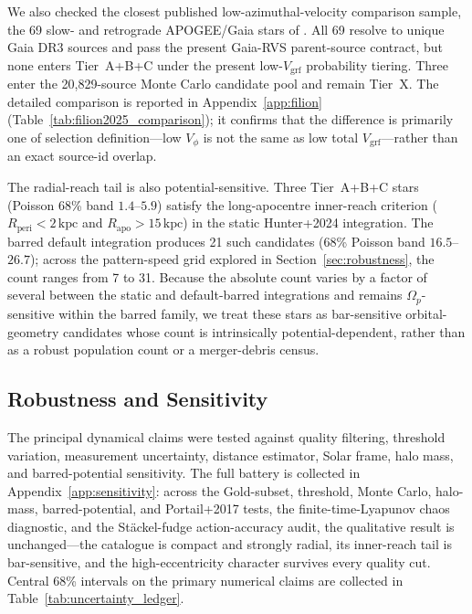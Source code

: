 \documentclass{aa}  %
\newcommand{\vgrf}{\ensuremath{V_{\mathrm{grf}}}\xspace}
\newcommand{\kpc}{\ensuremath{\,\mathrm{kpc}}\xspace}
\newcommand{\Rperi}{R_{\mathrm{peri}}}
\newcommand{\Rapo}{R_{\mathrm{apo}}}
\begin{document}
We also checked the closest published low-azimuthal-velocity comparison
sample, the 69 slow- and retrograde APOGEE/Gaia stars of
\citet{Filion2025}.  All 69 resolve to unique Gaia DR3 sources and pass
the present Gaia-RVS parent-source contract, but none enters
Tier~A+B+C under the present low-\vgrf{} probability tiering.  Three
enter the 20{,}829-source Monte Carlo candidate pool and remain Tier~X.
The detailed comparison is reported in Appendix~\ref{app:filion}
(Table~\ref{tab:filion2025_comparison}); it confirms that the difference
is primarily one of selection definition---low $V_\phi$ is not the same
as low total \vgrf{}---rather than an exact source-id overlap.

The radial-reach tail is also potential-sensitive.  Three Tier~A+B+C
stars (Poisson 68\% band $1.4$--$5.9$) satisfy the long-apocentre
inner-reach criterion
($\Rperi<2$\kpc{} and $\Rapo>15$\kpc) in the static Hunter+2024
integration.  The barred default integration produces 21 such candidates
(68\% Poisson band $16.5$--$26.7$); across the pattern-speed grid
explored in Section~\ref{sec:robustness}, the count ranges from 7 to 31.
Because the absolute count varies by a factor of several between the
static and default-barred integrations and remains $\Omega_p$-sensitive
within the barred family, we treat these stars as bar-sensitive
orbital-geometry candidates whose count is intrinsically
potential-dependent, rather than as a robust population count or a
merger-debris census.



\subsection{\label{sec:robustness}Robustness and Sensitivity}

The principal dynamical claims were tested against quality filtering,
threshold variation, measurement uncertainty, distance estimator, Solar
frame, halo mass, and barred-potential sensitivity. The full battery is
collected in Appendix~\ref{app:sensitivity}: across the Gold-subset,
threshold, Monte Carlo, halo-mass, barred-potential, and Portail+2017
tests, the finite-time-Lyapunov chaos diagnostic, and the St\"ackel-fudge
action-accuracy audit, the qualitative result is unchanged---the
catalogue is compact and strongly radial, its inner-reach tail is
bar-sensitive, and the high-eccentricity character survives every quality
cut. Central 68\% intervals on the primary numerical claims are collected
in Table~\ref{tab:uncertainty_ledger}.
\end{document}
